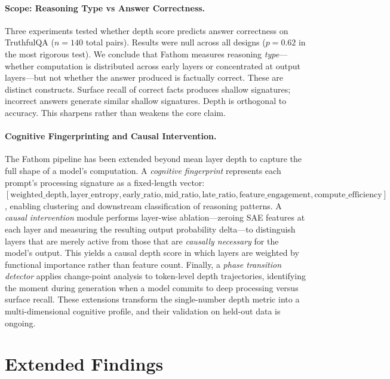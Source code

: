 \documentclass[10pt]{article}
\begin{document}
\paragraph{Scope: Reasoning Type vs Answer Correctness.}
Three experiments tested whether depth score predicts answer correctness on TruthfulQA ($n{=}140$ total pairs). Results were null across all designs ($p{=}0.62$ in the most rigorous test). We conclude that Fathom measures reasoning \emph{type}---whether computation is distributed across early layers or concentrated at output layers---but not whether the answer produced is factually correct. These are distinct constructs. Surface recall of correct facts produces shallow signatures; incorrect answers generate similar shallow signatures. Depth is orthogonal to accuracy. This sharpens rather than weakens the core claim.

\paragraph{Cognitive Fingerprinting and Causal Intervention.}
The Fathom pipeline has been extended beyond mean layer depth to capture the full shape of a model's computation. A \emph{cognitive fingerprint} represents each prompt's processing signature as a fixed-length vector: $[\text{weighted\_depth}, \text{layer\_entropy}, \text{early\_ratio}, \text{mid\_ratio}, \text{late\_ratio}, \text{feature\_engagement}, \text{compute\_efficiency}]$, enabling clustering and downstream classification of reasoning patterns. A \emph{causal intervention} module performs layer-wise ablation---zeroing SAE features at each layer and measuring the resulting output probability delta---to distinguish layers that are merely active from those that are \emph{causally necessary} for the model's output. This yields a causal depth score in which layers are weighted by functional importance rather than feature count. Finally, a \emph{phase transition detector} applies change-point analysis to token-level depth trajectories, identifying the moment during generation when a model commits to deep processing versus surface recall. These extensions transform the single-number depth metric into a multi-dimensional cognitive profile, and their validation on held-out data is ongoing.

\section{Extended Findings}
\end{document}
